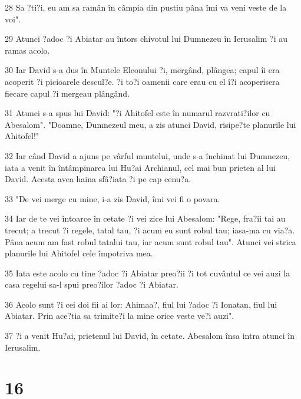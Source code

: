 \par 28 Sa ?ti?i, eu am sa ramân în câmpia din pustiu pâna îmi va veni veste de la voi".
\par 29 Atunci ?adoc ?i Abiatar au întors chivotul lui Dumnezeu în Ierusalim ?i au ramas acolo.
\par 30 Iar David s-a dus în Muntele Eleonului ?i, mergând, plângea; capul îi era acoperit ?i picioarele descul?e. ?i to?i oamenii care erau cu el î?i acoperisera fiecare capul ?i mergeau plângând.
\par 31 Atunci s-a spus lui David: "?i Ahitofel este în numarul razvrati?ilor cu Abesalom". "Doamne, Dumnezeul meu, a zis atunci David, risipe?te planurile lui Ahitofel!"
\par 32 Iar când David a ajuns pe vârful muntelui, unde s-a închinat lui Dumnezeu, iata a venit în întâmpinarea lui Hu?ai Archianul, cel mai bun prieten al lui David. Acesta avea haina sfâ?iata ?i pe cap cenu?a.
\par 33 "De vei merge cu mine, i-a zis David, îmi vei fi o povara.
\par 34 Iar de te vei întoarce în cetate ?i vei zice lui Abesalom: "Rege, fra?ii tai au trecut; a trecut ?i regele, tatal tau, ?i acum eu sunt robul tau; iasa-ma cu via?a. Pâna acum am fast robul tatalui tau, iar acum sunt robul tau". Atunci vei strica planurile lui Ahitofel cele împotriva mea.
\par 35 Iata este acolo cu tine ?adoc ?i Abiatar preo?ii ?i tot cuvântul ce vei auzi la casa regelui sa-l spui preo?ilor ?adoc ?i Abiatar.
\par 36 Acolo sunt ?i cei doi fii ai lor: Ahimaa?, fiul lui ?adoc ?i Ionatan, fiul lui Abiatar. Prin ace?tia sa trimite?i la mine orice veste ve?i auzi".
\par 37 ?i a venit Hu?ai, prietenul lui David, în cetate. Abesalom însa intra atunci în Ierusalim.

\chapter{16}


